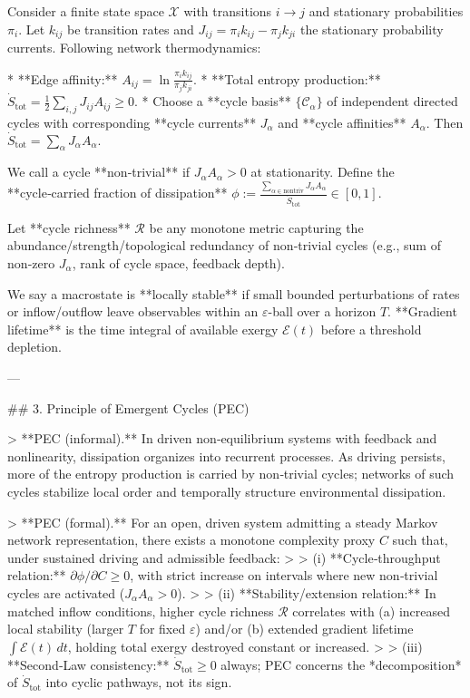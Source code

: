 Consider a finite state space $\mathcal{X}$ with transitions $i \to j$ and stationary probabilities $\pi_i$. Let $k_{ij}$ be transition rates and $J_{ij} = \pi_i k_{ij} - \pi_j k_{ji}$ the stationary probability currents. Following network thermodynamics:

* **Edge affinity:** $A_{ij} = \ln\!\frac{\pi_i k_{ij}}{\pi_j k_{ji}}$.
* **Total entropy production:** $\displaystyle \dot S_{\mathrm{tot}} = \tfrac{1}{2} \sum_{i,j} J_{ij} A_{ij} \ge 0.$
* Choose a **cycle basis** $\{\mathcal{C}_\alpha\}$ of independent directed cycles with corresponding **cycle currents** $J_\alpha$ and **cycle affinities** $A_\alpha$. Then
  $\dot S_{\mathrm{tot}} = \sum_{\alpha} J_\alpha A_\alpha.$

We call a cycle **non‑trivial** if $J_\alpha A_\alpha > 0$ at stationarity. Define the **cycle‑carried fraction of dissipation**
$\phi := \frac{\sum_{\alpha \in \mathrm{nontriv}} J_\alpha A_\alpha}{\dot S_{\mathrm{tot}}} \in [0,1].$

Let **cycle richness** $\mathcal{R}$ be any monotone metric capturing the abundance/strength/topological redundancy of non‑trivial cycles (e.g., sum of non‑zero $J_\alpha$, rank of cycle space, feedback depth).

We say a macrostate is **locally stable** if small bounded perturbations of rates or inflow/outflow leave observables within an $\varepsilon$-ball over a horizon $T$. **Gradient lifetime** is the time integral of available exergy $\mathcal{E}(t)$ before a threshold depletion.

---

## 3. Principle of Emergent Cycles (PEC)

> **PEC (informal).** In driven non‑equilibrium systems with feedback and nonlinearity, dissipation organizes into recurrent processes. As driving persists, more of the entropy production is carried by non‑trivial cycles; networks of such cycles stabilize local order and temporally structure environmental dissipation.

> **PEC (formal).** For an open, driven system admitting a steady Markov network representation, there exists a monotone complexity proxy $C$ such that, under sustained driving and admissible feedback:
>
> (i) **Cycle‑throughput relation:** $\partial \phi / \partial C \ge 0$, with strict increase on intervals where new non‑trivial cycles are activated ($J_\alpha A_\alpha>0$).
>
> (ii) **Stability/extension relation:** In matched inflow conditions, higher cycle richness $\mathcal{R}$ correlates with (a) increased local stability (larger $T$ for fixed $\varepsilon$) and/or (b) extended gradient lifetime $\int \mathcal{E}(t)\,dt$, holding total exergy destroyed constant or increased.
>
> (iii) **Second‑Law consistency:** $\dot S_{\mathrm{tot}}\ge 0$ always; PEC concerns the *decomposition* of $\dot S_{\mathrm{tot}}$ into cyclic pathways, not its sign.

